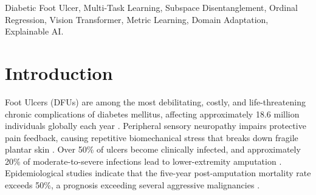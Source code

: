\documentclass[journal]{IEEEtran}
\begin{document}
\begin{abstract}
The primary 59,783,374-parameter architecture was evaluated across the DFUC2021 benchmark ($n = 5,955$ labeled samples) and a deduplicated Wagner cohort ($n = 11,491$ training samples). On the 20\% development validation split ($n = 1,191$), our primary 45-epoch model achieves a Macro-F1 of \textbf{0.9201} and an overall accuracy of \textbf{90.18\%}, elevating \textit{Ischaemia} F1-score to \textbf{0.9149} with \textbf{93.48\%} sensitivity. Concurrently, the network achieves an ordinal Quadratic Weighted Kappa (QWK) of \textbf{0.7765}, adjacent depth accuracy of \textbf{91.42\%}, and Mean Absolute Error (MAE) of \textbf{0.4290} on the Wagner grading validation set ($n = 303$). A $5 \times 4$ exploratory joint probability distribution models concurrent risk under conditional independence. Controlled ablations on the leak-free quarantined benchmark validate that active hard-pair mining provides a $+1.61\%$ Macro-F1 gain ($+2.60\%$ accuracy gain), while multi-task trade-offs and cross-dataset duplicate integrity are formally disclosed.
\end{abstract}

\begin{IEEEkeywords}
Diabetic Foot Ulcer, Multi-Task Learning, Subspace Disentanglement, Ordinal Regression, Vision Transformer, Metric Learning, Domain Adaptation, Explainable AI.
\end{IEEEkeywords}

\IEEEpeerreviewmaketitle

\section{Introduction}
 Foot Ulcers (DFUs) are among the most debilitating, costly, and life-threatening chronic complications of diabetes mellitus, affecting approximately 18.6 million individuals globally each year \cite{yap2022development, schaper2020practical}. Peripheral sensory neuropathy impairs protective pain feedback, causing repetitive biomechanical stress that breaks down fragile plantar skin \cite{schaper2020practical}. Over 50\% of ulcers become clinically infected, and approximately 20\% of moderate-to-severe infections lead to lower-extremity amputation \cite{schaper2020practical}. Epidemiological studies indicate that the five-year post-amputation mortality rate exceeds 50\%, a prognosis exceeding several aggressive malignancies \cite{yap2022development, armstrong1998validation}.
\end{document}
